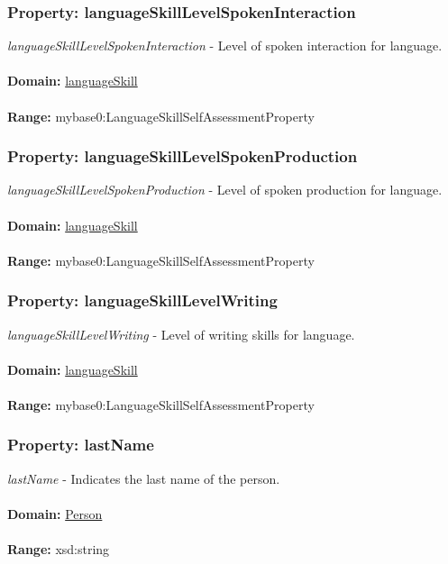 \documentclass[a4paper,12pt]{article}
\numberwithin{equation}{section}
\begin{document}
\subsubsection{Property: languageSkillLevelSpokenInteraction}\hypertarget{languageSkillLevelSpokenInteraction}{}
\textit{languageSkillLevelSpokenInteraction} - Level of spoken interaction for language.
\\\\
\textbf{Domain:} \hyperlink{languageSkill}{languageSkill} 
\\\\
\textbf{Range:}   mybase0:LanguageSkillSelfAssessmentProperty 

\subsubsection{Property: languageSkillLevelSpokenProduction}\hypertarget{languageSkillLevelSpokenProduction}{}
\textit{languageSkillLevelSpokenProduction} - Level of spoken production for language.
\\\\
\textbf{Domain:} \hyperlink{languageSkill}{languageSkill} 
\\\\
\textbf{Range:}   mybase0:LanguageSkillSelfAssessmentProperty 

\subsubsection{Property: languageSkillLevelWriting}\hypertarget{languageSkillLevelWriting}{}
\textit{languageSkillLevelWriting} - Level of writing skills for language.
\\\\
\textbf{Domain:} \hyperlink{languageSkill}{languageSkill} 
\\\\
\textbf{Range:}   mybase0:LanguageSkillSelfAssessmentProperty 

\subsubsection{Property: lastName}\hypertarget{lastName}{}
\textit{lastName} - Indicates the last name of the person.
\\\\
\textbf{Domain:} \hyperlink{Person}{Person} 
\\\\
\textbf{Range:}   xsd:string
\end{document}
